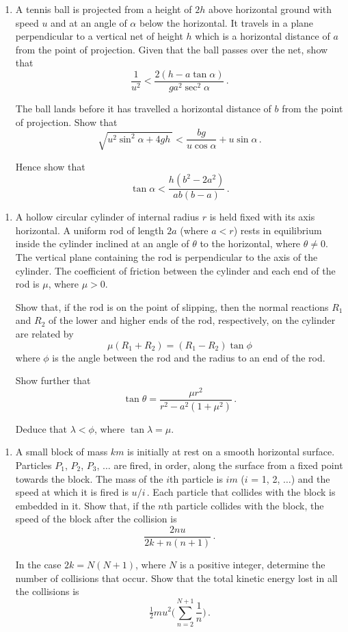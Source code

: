 \documentclass[a4, 11pt]{report}
\newlength{\qspace}
\newcounter{qnumber}
\newenvironment{question}%
 {\vspace{\qspace}
  \begin{enumerate}[\bfseries 1\quad][10]%
    \setcounter{enumi}{\value{qnumber}}%
    \item%
 }
{
  \end{enumerate}
  \filbreak
  \stepcounter{qnumber}
 }
\begin{document}
	
\begin{question}
A tennis ball
is projected from a height of 
$2h$ above horizontal ground with speed $u$ and  at an angle of $\alpha$
below the horizontal. It travels in a plane 
perpendicular to a vertical net of height $h$ which 
is a horizontal distance of $a$ from the point of 
projection. Given that the ball passes over the net,
show that 
\[
\frac 1{u^2}< 
 \frac 
{2(h-a\tan\alpha)}
{ga^2\sec^2\alpha}\,.
\]  

The ball lands before it has travelled a horizontal distance
of $b$ from the point of projection. Show that
\[ 
\sqrt{u^2\sin^2\alpha +4gh \ } < \frac{bg}{u\cos\alpha} + u \sin\alpha\,.
\]

Hence show that 
\[
\tan\alpha < \frac{h(b^2-2a^2)}{ab(b-a)}\,.
\]
	\end{question}
	
\begin{question}	
A hollow circular cylinder of internal radius $r$
is held fixed with its axis 
horizontal. A uniform rod of length $2a$ (where $a<r$)
 rests in equilibrium
inside the cylinder inclined at an angle of 
$\theta$ to the horizontal, where $\theta\ne0$.
The vertical plane containing the rod is perpendicular to the 
axis of the cylinder. The coefficient of friction
between the cylinder and each end of the rod is $\mu$, where $\mu>0$. 

Show that, if the rod is on the point of slipping, then
the normal reactions $R_1$ and $R_2$ of the lower and higher
ends of the
rod, respectively, on the cylinder are related by
\[
\mu(R_1+R_2) = (R_1-R_2)\tan\phi
\]
where $\phi$ is the angle between the rod and the radius to
an  end of the rod.

Show further that
\[
\tan\theta = \frac {\mu r^2}{r^2 -a^2(1+\mu^2)}\,.
\]

Deduce that $\lambda <\phi $, where $\tan\lambda =\mu$.
\end{question}


\begin{question}
A small block of mass $km$
is initially at rest on a smooth horizontal surface.
Particles $P_1$, $P_2$, $P_3$, $\ldots$ are fired, in order, along the 
surface from a fixed point
towards the
 block. 
The mass of the $i$th particle is $im$ ($i$ = 1, 2, $\ldots$)
and the speed
at which it is fired is $u/i\,$.
 Each particle that collides with the block is
embedded in it. 
Show that, if the $n$th particle collides with the block, the 
 speed of the block after the collision is
\[
\frac{2nu}{2k +n(n+1)}\,.
\]

In the case $2k = N(N+1)$, where $N$ is a positive integer,
determine the number of collisions that occur.
Show that the total kinetic energy lost in all the collisions
is
\[
\tfrac12 mu^2\bigg( \sum_{n=2}^{N+1} \frac 1 n \bigg)\,.
\]
\end{question}
	
\end{document}
